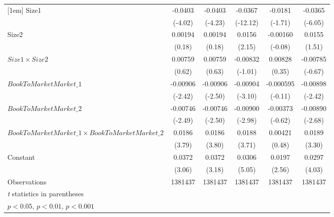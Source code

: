{\begin{tabular}{l*{5}{c}}
[1em]
Size1               &     -0.0403\sym{***}&     -0.0403\sym{***}&     -0.0367\sym{***}&     -0.0181         &     -0.0365\sym{***}\\
                    &     (-4.02)         &     (-4.23)         &    (-12.12)         &     (-1.71)         &     (-6.05)         \\
[1em]
Size2               &     0.00194         &     0.00194         &      0.0156\sym{*}  &    -0.00160         &      0.0155         \\
                    &      (0.18)         &      (0.18)         &      (2.15)         &     (-0.08)         &      (1.51)         \\
[1em]
$ Size1 \times Size2 $&     0.00759         &     0.00759         &    -0.00832         &     0.00828         &    -0.00785         \\
                    &      (0.62)         &      (0.63)         &     (-1.01)         &      (0.35)         &     (-0.67)         \\
[1em]
$ BookToMarketMarket\_1 $&    -0.00906\sym{*}  &    -0.00906\sym{*}  &    -0.00904\sym{**} &   -0.000595         &    -0.00898\sym{*}  \\
                    &     (-2.42)         &     (-2.50)         &     (-3.10)         &     (-0.11)         &     (-2.42)         \\
[1em]
$ BookToMarketMarket\_2 $&    -0.00746\sym{*}  &    -0.00746\sym{*}  &    -0.00900\sym{**} &    -0.00373         &    -0.00890\sym{**} \\
                    &     (-2.49)         &     (-2.50)         &     (-2.98)         &     (-0.62)         &     (-2.68)         \\
[1em]
$ BookToMarketMarket\_1 \times BookToMarketMarket\_2 $&      0.0186\sym{***}&      0.0186\sym{***}&      0.0188\sym{***}&     0.00421         &      0.0189\sym{***}\\
                    &      (3.79)         &      (3.80)         &      (3.71)         &      (0.48)         &      (3.30)         \\
[1em]
Constant            &      0.0372\sym{**} &      0.0372\sym{**} &      0.0306\sym{***}&      0.0197\sym{*}  &      0.0297\sym{***}\\
                    &      (3.06)         &      (3.18)         &      (5.05)         &      (2.56)         &      (4.03)         \\
\hline
Observations        &     1381437         &     1381437         &     1381437         &     1381437         &     1381437         \\
\hline\hline
\multicolumn{6}{l}{\footnotesize \textit{t} statistics in parentheses}\\
\multicolumn{6}{l}{\footnotesize \sym{*} \(p<0.05\), \sym{**} \(p<0.01\), \sym{***} \(p<0.001\)}\\
\end{tabular}
}
